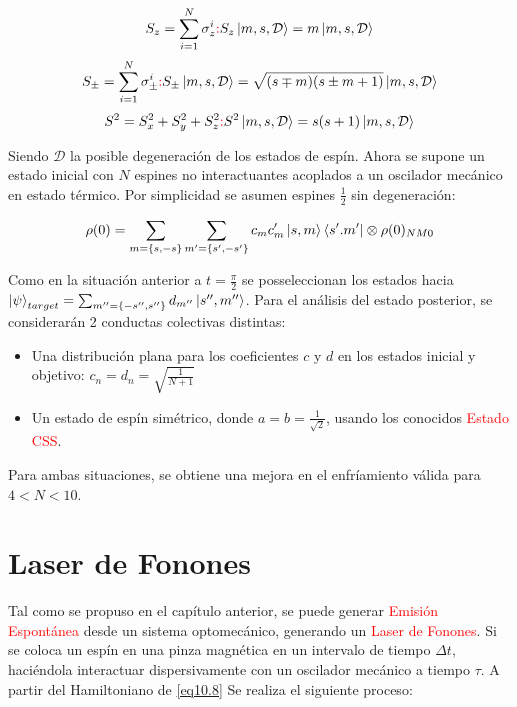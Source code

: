 \documentclass{book}
\begin{document}
\begin{equation}\label{eq10.11}S_z=\sum_{i=1}^N  \sigma_z^i \textcolor{red}{:} S_z\ket{m,s,\mathcal{D}}=m\ket{m,s,\mathcal{D}} \end{equation}
\begin{equation}\label{eq10.12}S_\pm=\sum_{i=1}^N \sigma_\pm^i \textcolor{red}{:} S_\pm \ket{m,s,\mathcal{D}}=\sqrt{(s\mp m )(s\pm m+1)}\ket{m,s,\mathcal{D}} \end{equation}
\begin{equation}\label{eq10.13}S^2=S_x^2+S_y^2+S_z^2\textcolor{red}{:} S^2\ket{m,s,\mathcal{D}}=s(s+1)\ket{m,s,\mathcal{D}}\end{equation}

Siendo $\mathcal{D}$ la posible degeneración de los estados de espín. Ahora se supone un estado inicial con $N$ espines no interactuantes acoplados a un oscilador mecánico en estado térmico. Por simplicidad se asumen espines $\frac{1}{2}$ sin degeneración:

\begin{equation}\label{eq10.14}\rho(0)=\sum_{m=\{s,-s\}}\sum_{m^\prime=\{s^\prime,-s^\prime\}}c_mc_m^\prime\ket{s,m}\bra{s^\prime.m^\prime}\otimes\rho(0)_{NM0}\end{equation}

Como en la situación anterior a $t=\frac{\pi}{2}$ se posseleccionan los estados hacia $\ket{\psi}_{target}=\sum_{m^{\prime\prime}=\{-s^{\prime\prime},s^{\prime\prime}\}}d_{m^{\prime\prime}}\ket{s^{\prime\prime},m^{\prime\prime}}$. Para el análisis del estado posterior, se considerarán 2 conductas colectivas distintas:

\begin{itemize}
    \item Una distribución plana para los coeficientes $c$
y $d$ en los estados inicial y objetivo: $c_n=d_n=\sqrt{\frac{1}{N+1}}$    
   \item Un estado de espín simétrico, donde $a=b=\frac{1}{\sqrt{2}}$, usando los conocidos \textcolor{red}{Estado CSS}.
\end{itemize}

Para ambas situaciones, se obtiene una mejora en el enfríamiento válida para $4<N<10$.

\section{Laser de Fonones}

Tal como se propuso en el capítulo anterior, se puede generar \textcolor{red}{Emisión Espontánea} desde un sistema optomecánico, generando un \textcolor{red}{Laser de Fonones}. Si se coloca un espín en una pinza magnética en un intervalo de tiempo $\Delta t$, haciéndola interactuar dispersivamente con un oscilador mecánico a tiempo $\tau$. A partir del Hamiltoniano de \ref{eq10.8} Se realiza el siguiente proceso:
\end{document}
